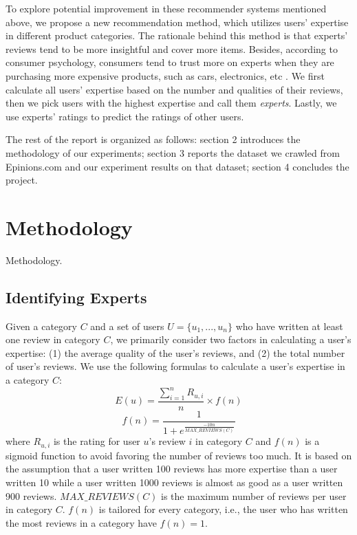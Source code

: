 \documentclass[12pt]{article}
\begin{document}
To explore potential improvement in these recommender systems mentioned above, we propose a new recommendation method, which utilizes users' expertise in different product categories. The rationale behind this method is that experts' reviews tend to be more insightful and cover more items. Besides, according to consumer psychology, consumers tend to trust more on experts when they are purchasing more expensive products, such as cars, electronics, etc \cite{consumer}. We first calculate all users' expertise based on the number and qualities of their reviews, then we pick users with the highest expertise and call them \emph{experts}. Lastly, we use experts' ratings to predict the ratings of other users. 

The rest of the report is organized as follows: section 2 introduces the methodology of our experiments; section 3 reports the dataset we crawled from Epinions.com and our experiment results on that dataset; section 4 concludes the project. 

\section{Methodology}
Methodology.

\subsection{Identifying Experts} %
\label{sub:identifying_experts}

Given a category $C$ and a set of users $U = \{{u_{1}, ..., u_{n}}\}$ who have written at least one review in category $C$, we primarily consider two factors in calculating a user's expertise: (1) the average quality of the user's reviews, and (2) the total number of user's reviews. We use the following formulas to calculate a user's expertise in a category $C$:
\begin{equation}
E(u) = \frac{\sum_{i=1}^n R_{u, i}} {n} \times f(n)
\end{equation}
\begin{equation}
f(n) = \frac{1}{1 + e^{\frac{-10n} {MAX\_REVIEWS(C)}}}
\end{equation}
where $R_{u, i}$ is the rating for user $u$'s review $i$ in category $C$ and $f(n)$ is a sigmoid function to avoid favoring the number of reviews too much. It is based on the assumption that a user written 100 reviews has more expertise than a user written 10 while a user written 1000 reviews is almost as good as a user written 900 reviews. $MAX\_REVIEWS(C)$ is the maximum number of reviews per user in category $C$. $f(n)$ is tailored for every category, i.e., the user who has written the most reviews in a category have $f(n)=1$.
\end{document}
